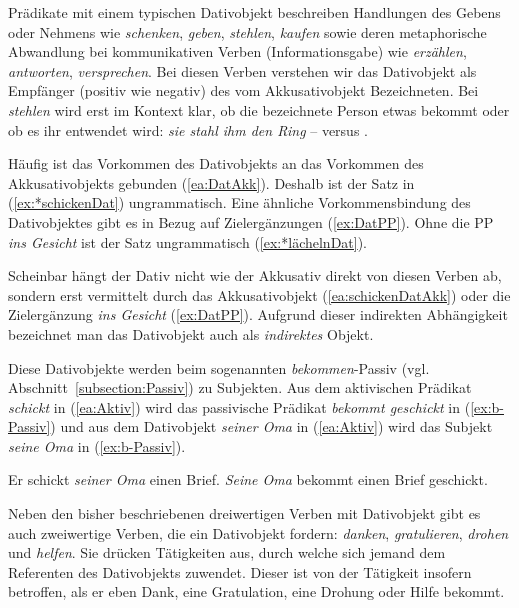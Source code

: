 Prädikate mit einem typischen Dativobjekt beschreiben Handlungen des Gebens oder Nehmens wie \textit{schenken}, \textit{geben}, \textit{stehlen}, \textit{kaufen} sowie deren metaphorische Abwandlung bei kommunikativen Verben (Informationsgabe) wie \textit{erzählen}, \textit{antworten}, \textit{versprechen}. Bei diesen Verben verstehen wir das Dativobjekt als Empfänger (positiv wie negativ) des vom Akkusativobjekt Bezeichneten. Bei \textit{stehlen} wird erst im Kontext klar, ob die bezeichnete Person etwas bekommt oder ob es ihr entwendet wird: \textit{sie stahl ihm den Ring} --  versus . 

Häufig ist das Vorkommen des Dativobjekts an das Vorkommen des Akkusativobjekts gebunden (\ref{ea:DatAkk}). Deshalb ist der Satz in (\ref{ex:*schickenDat}) ungrammatisch. Eine ähnliche Vorkommensbindung des Dativobjektes gibt es in Bezug auf Zielergänzungen (\ref{ex:DatPP}). Ohne die PP \textit{ins Gesicht} ist der Satz ungrammatisch (\ref{ex:*lächelnDat}).  

\ea \label{ea:DatAkk}
\label{ea:schickenDatAkk}
\label{ex:*schickenDat}
\label{ex:DatPP}
\label{ex:*lächelnDat}
\z 
\z 

Scheinbar hängt der Dativ nicht wie der Akkusativ direkt von diesen Verben ab, sondern erst vermittelt durch das Akkusativobjekt (\ref{ea:schickenDatAkk}) oder die Zielergänzung \textit{ins Gesicht} (\ref{ex:DatPP}). 
Aufgrund dieser indirekten Abhängigkeit bezeichnet man das Dativobjekt auch als \textit{indirektes} Objekt. 

Diese Dativobjekte werden beim sogenannten \textit{bekommen}-Passiv (vgl. Abschnitt~\ref{subsection:Passiv}) zu Subjekten. Aus dem aktivischen Prädikat \textit{schickt} in (\ref{ea:Aktiv}) wird das passivische Prädikat \textit{bekommt geschickt} in (\ref{ex:b-Passiv}) und aus dem Dativobjekt \textit{seiner Oma} in (\ref{ea:Aktiv}) wird das Subjekt \textit{seine Oma} in (\ref{ex:b-Passiv}).

\ea \label{ea:bekommenPassiv}
\ea \label{ea:Aktiv} Er schickt \textit{seiner Oma} einen Brief.
\ex \label{ex:b-Passiv} \textit{Seine Oma} bekommt einen Brief geschickt.
\z 
\z 

Neben den bisher beschriebenen dreiwertigen Verben mit Dativobjekt gibt es auch zweiwertige Verben, die ein Dativobjekt fordern: \zB \textit{danken}, \textit{gratulieren}, \textit{drohen} und \textit{helfen}. Sie drücken Tätigkeiten aus, durch welche sich jemand dem Referenten des Dativobjekts zuwendet. Dieser ist von der Tätigkeit insofern betroffen, als er eben Dank, eine Gratulation, eine Drohung oder Hilfe bekommt. 

